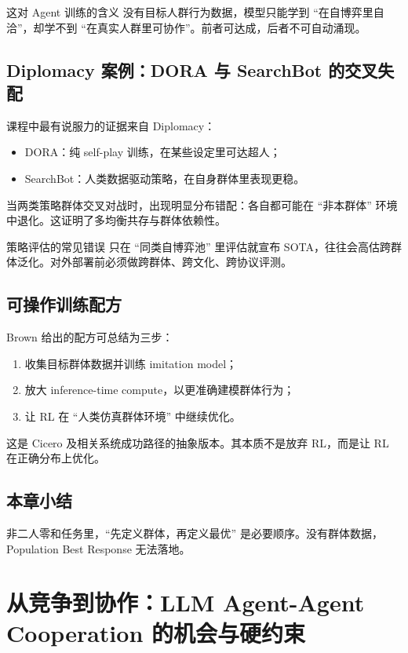 \documentclass[a4paper]{article}
\begin{document}
\begin{knowledgebox}{这对 Agent 训练的含义}
没有目标人群行为数据，模型只能学到 ``在自博弈里自洽''，却学不到 ``在真实人群里可协作''。前者可达成，后者不可自动涌现。
\end{knowledgebox}

\subsection{Diplomacy 案例：DORA 与 SearchBot 的交叉失配}
课程中最有说服力的证据来自 Diplomacy：
\begin{itemize}
    \item DORA：纯 self-play 训练，在某些设定里可达超人；
    \item SearchBot：人类数据驱动策略，在自身群体里表现更稳。
\end{itemize}
当两类策略群体交叉对战时，出现明显分布错配：各自都可能在 ``非本群体'' 环境中退化。这证明了多均衡共存与群体依赖性。

\begin{warningbox}{策略评估的常见错误}
只在 ``同类自博弈池'' 里评估就宣布 SOTA，往往会高估跨群体泛化。对外部署前必须做跨群体、跨文化、跨协议评测。
\end{warningbox}

\subsection{可操作训练配方}
Brown 给出的配方可总结为三步：
\begin{enumerate}
    \item 收集目标群体数据并训练 imitation model；
    \item 放大 inference-time compute，以更准确建模群体行为；
    \item 让 RL 在 ``人类仿真群体环境'' 中继续优化。
\end{enumerate}

这是 Cicero 及相关系统成功路径的抽象版本。其本质不是放弃 RL，而是让 RL 在正确分布上优化。

\subsection{本章小结}
非二人零和任务里，``先定义群体，再定义最优'' 是必要顺序。没有群体数据，Population Best Response 无法落地。

\section{从竞争到协作：LLM Agent-Agent Cooperation 的机会与硬约束}
\end{document}

